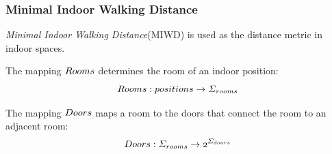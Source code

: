 \begin{frame}
\frametitle{Minimal Indoor Walking Distance}

\emph{Minimal Indoor Walking Distance}(MIWD) is used as the distance metric in indoor spaces.
\pause

The mapping $\mathnormal{Rooms}$ determines the room of an indoor position:
\pause
\begin{equation}
\mathnormal{Rooms: positions \rightarrow \Sigma_{rooms}}
\end{equation}

\pause

The mapping $\mathnormal{Doors}$ maps a room to the doors that connect the room to an adjacent room:
\pause
\begin{equation}
\mathnormal{Doors: \Sigma_{rooms} \rightarrow 2^{\Sigma_{doors}}}
\end{equation}

\end{frame}


